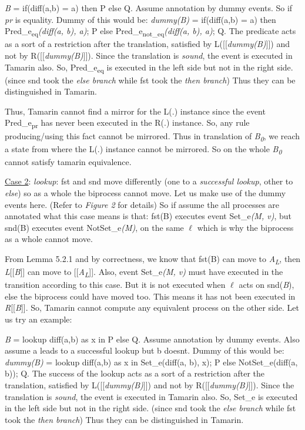 \documentclass[11pt]{article}
\begin{document}
{\it B} = if(diff(a,b) = a) then P else Q. Assume annotation by dummy events. So if {\it pr} is equality. Dummy of this would be: {\it dummy(B)} = if(diff(a,b) = a) then Pred\_e\textsubscript{eq}{\it (diff(a, b), a)}; P else Pred\_e\textsubscript{not\_eq}{\it (diff(a, b), a)}; Q. The predicate acts as a sort of a restriction after the translation, satisfied by L([[{\it dummy(B)}]]) and not by R([[{\it dummy(B)}]]). Since the translation is {\it sound}, the event is executed in Tamarin also. So, Pred\_e\textsubscript{eq} is executed in the left side but not in the right side. (since snd took the {\it else branch} while fst took the {\it then branch}) Thus they can be distinguished in Tamarin. 

Thus, Tamarin cannot find a mirror for the L(.) instance since the event Pred\_e\textsubscript{pr} has never been executed in the R(.) instance. So, any rule producing/using this fact cannot be mirrored. Thus in translation of {\it B\textsubscript{0}}, we reach a state from where the L(.) instance cannot be mirrored. So on the whole {\it B\textsubscript{0}} cannot satisfy tamarin equivalence.\newline

\underline{Case 2}:  {\it lookup}: fst and snd move differently (one to a {\it successful lookup}, other to {\it else}) so as a whole the biprocess cannot move. Let us make use of the dummy events here. (Refer to {\it Figure 2} for details) So if assume the all processes are annotated what this case means is that: fst(B) executes event Set\_e{\it (M, v)}, but snd(B) executes event NotSet\_e{\it (M)}, on the same $\ell$ which is why the biprocess as a whole cannot move.

From Lemma 5.2.1 and by correctness, we know that fst(B) can move to {\it A\textsubscript{L}}, then {\it L}[[{\it B}]] can move to [[{\it A\textsubscript{L}}]]. Also, event Set\_e{\it (M, v)} must have executed in the transition according to this case. But it is not executed when $\ell$ acts on snd({\it B}), else the biprocess could have moved too. This means it has not been executed in {\it R}[[{\it B}]]. So, Tamarin cannot compute any equivalent process on the other side. Let us try an example:

{\it B} = lookup diff(a,b) as x in P else Q. Assume annotation by dummy events. Also assume a leads to a successful lookup but b doesnt. Dummy of this would be: {\it dummy(B)} = lookup diff(a,b) as x in Set\_e(diff(a, b), x); P else NotSet\_e(diff(a, b)); Q. The success of the lookup acts as a sort of a restriction after the translation, satisfied by L([[{\it dummy(B)}]]) and not by R([[{\it dummy(B)}]]). Since the translation is {\it sound}, the event is executed in Tamarin also. So, Set\_e is executed in the left side but not in the right side. (since snd took the {\it else branch} while fst took the {\it then branch}) Thus they can be distinguished in Tamarin. 
\end{document}
